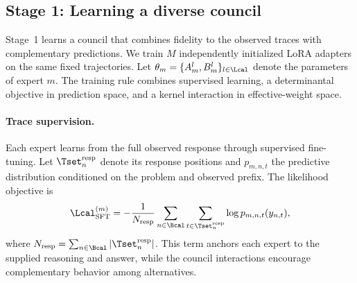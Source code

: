 \subsection{Stage 1: Learning a diverse council}
\label{sec:stage1}

Stage~1 learns a council that combines fidelity to the observed traces with
complementary predictions. We train $M$ independently initialized LoRA
adapters on the same fixed trajectories. Let
$\theta_m=\{A_m^l,B_m^l\}_{l\in\Lcal}$ denote the parameters of expert $m$.
The training rule combines supervised learning, a determinantal objective in
prediction space, and a kernel interaction in effective-weight space.

\paragraph{Trace supervision.}
Each expert learns from the full observed response through supervised
fine-tuning. Let $\Tset_n^{\mathrm{resp}}$ denote its response positions and
$p_{m,n,t}$ the predictive distribution conditioned on the problem and
observed prefix. The likelihood objective is
\begin{equation}
 \Lcal_{\mathrm{SFT}}^{(m)}=
 -\frac{1}{N_{\mathrm{resp}}}
 \sum_{n\in\Bcal}\sum_{t\in\Tset_n^{\mathrm{resp}}}
 \log p_{m,n,t}(y_{n,t}),
 \label{eq:sft1}
\end{equation}
where $N_{\mathrm{resp}}=\sum_{n\in\Bcal}|\Tset_n^{\mathrm{resp}}|$.
This term anchors each expert to the supplied reasoning and answer, while the
council interactions encourage complementary behavior among alternatives.

